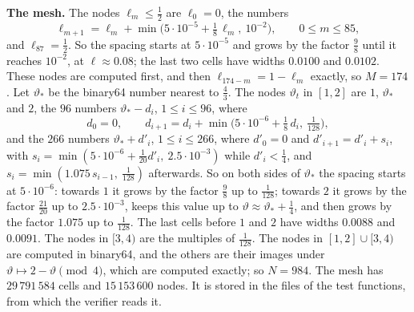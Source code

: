 \documentclass[11pt]{amsart}
\theoremstyle{definition}
\theoremstyle{remark}
\begin{document}
\medskip\noindent\textbf{The mesh.} The nodes $\ell_m\le\frac12$ are $\ell_0=0$, the numbers
\[
  \ell_{m+1}=\ell_m+\min\bigl(5\cdot10^{-5}+\tfrac18\,\ell_m,\ 10^{-2}\bigr),\qquad 0\le m\le85,
\]
and $\ell_{87}=\frac12$. So the spacing starts at $5\cdot10^{-5}$ and grows by the factor $\frac98$ until it reaches $10^{-2}$, at $\ell\approx0.08$; the last two cells have widths $0.0100$ and $0.0102$. These nodes are computed first, and then $\ell_{174-m}=1-\ell_m$ exactly, so $M=174$. Let $\vartheta_*$ be the binary64 number nearest to $\frac43$. The nodes $\vartheta_t$ in $[1,2]$ are $1$, $\vartheta_*$ and $2$, the $96$ numbers $\vartheta_*-d_i$, $1\le i\le96$, where
\[
  d_0=0,\qquad d_{i+1}=d_i+\min\bigl(5\cdot10^{-6}+\tfrac18\,d_i,\ \tfrac1{128}\bigr),
\]
and the $266$ numbers $\vartheta_*+d'_i$, $1\le i\le266$, where $d'_0=0$ and $d'_{i+1}=d'_i+s_i$, with $s_i=\min(5\cdot10^{-6}+\frac1{20}d'_i,\ 2.5\cdot10^{-3})$ while $d'_i<\frac14$, and $s_i=\min(1.075\,s_{i-1},\ \frac1{128})$ afterwards. So on both sides of $\vartheta_*$ the spacing starts at $5\cdot10^{-6}$: towards $1$ it grows by the factor $\frac98$ up to $\frac1{128}$; towards $2$ it grows by the factor $\frac{21}{20}$ up to $2.5\cdot10^{-3}$, keeps this value up to $\vartheta\approx\vartheta_*+\frac14$, and then grows by the factor $1.075$ up to $\frac1{128}$. The last cells before $1$ and $2$ have widths $0.0088$ and $0.0091$. The nodes in $[3,4)$ are the multiples of $\frac1{128}$. The nodes in $[1,2]\cup[3,4)$ are computed in binary64, and the others are their images under $\vartheta\mapsto2-\vartheta\pmod4$, which are computed exactly; so $N=984$. The mesh has $29\,791\,584$ cells and $15\,153\,600$ nodes. It is stored in the files of the test functions, from which the verifier reads it.
\end{document}
